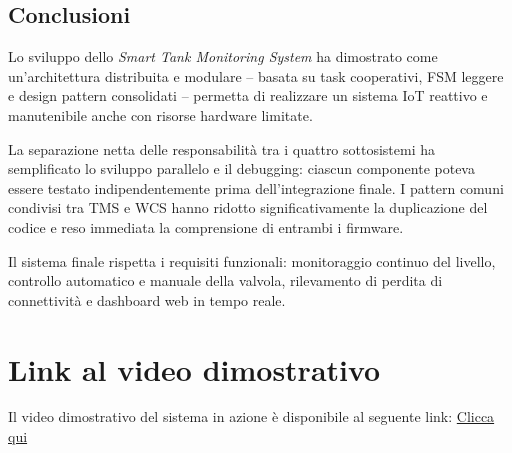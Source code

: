 \documentclass[12pt, a4paper]{article}
\begin{document}
\subsection{Conclusioni}

Lo sviluppo dello \textit{Smart Tank Monitoring System} ha dimostrato come un'architettura distribuita e modulare -- basata su task cooperativi, FSM leggere e design pattern consolidati -- permetta di realizzare un sistema IoT reattivo e manutenibile anche con risorse hardware limitate.

La separazione netta delle responsabilità tra i quattro sottosistemi ha semplificato lo sviluppo parallelo e il debugging: ciascun componente poteva essere testato indipendentemente prima dell'integrazione finale. I pattern comuni condivisi tra TMS e WCS hanno ridotto significativamente la duplicazione del codice e reso immediata la comprensione di entrambi i firmware.

Il sistema finale rispetta i requisiti funzionali: monitoraggio continuo del livello, controllo automatico e manuale della valvola, rilevamento di perdita di connettività e dashboard web in tempo reale.


\section{Link al video dimostrativo}
Il video dimostrativo del sistema in azione è disponibile al seguente link: \href{https://liveunibo-my.sharepoint.com/:v:/g/personal/giuseppe_cattolico_studio_unibo_it/IQBa6F1gB55XSLYPmsERKnfZAb7FWOWHKEoVaHiGJA5QiC4?nav=eyJyZWZlcnJhbEluZm8iOnsicmVmZXJyYWxBcHAiOiJPbmVEcml2ZUZvckJ1c2luZXNzIiwicmVmZXJyYWxBcHBQbGF0Zm9ybSI6IldlYiIsInJlZmVycmFsTW9kZSI6InZpZXciLCJyZWZlcnJhbFZpZXciOiJNeUZpbGVzTGlua0NvcHkifX0&e=65CfIX}{Clicca qui }
\end{document}
